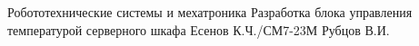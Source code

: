 \documentclass{bmstu}
\begin{document}
                       {Робототехнические системы и мехатроника}                    %
                       {Разработка блока управления температурой серверного шкафа}  %
                       {Есенов К.Ч./СМ7-23М}                                        %
                       {Рубцов В.И.}                                                %
                       {}                                                           %
\end{document}
